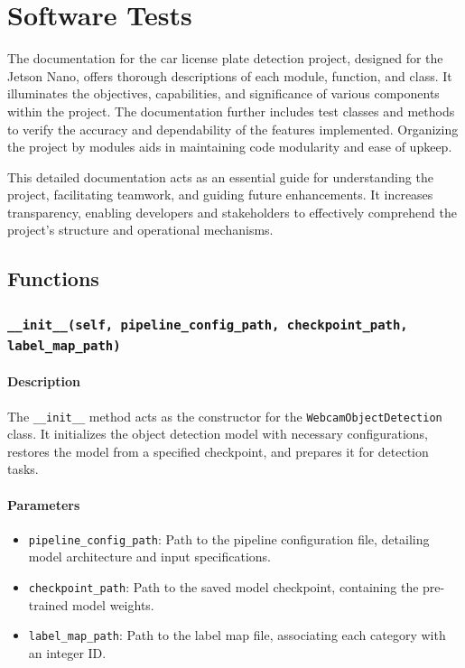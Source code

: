 %
%


\chapter{Software Tests }
\label{chapter:SoftwareTests}

	The documentation for the car license plate detection project, designed for the Jetson Nano, offers thorough descriptions of each module, function, and class. It illuminates the objectives, capabilities, and significance of various components within the project. The documentation further includes test classes and methods to verify the accuracy and dependability of the features implemented. Organizing the project by modules aids in maintaining code modularity and ease of upkeep.
	
	This detailed documentation acts as an essential guide for understanding the project, facilitating teamwork, and guiding future enhancements. It increases transparency, enabling developers and stakeholders to effectively comprehend the project's structure and operational mechanisms.


\section{Functions}

\subsection{\texttt{\_\_init\_\_(self, pipeline\_config\_path, checkpoint\_path, label\_map\_path)}}

\subsubsection{Description}
The \texttt{\_\_init\_\_} method acts as the constructor for the \texttt{WebcamObjectDetection} class. It initializes the object detection model with necessary configurations, restores the model from a specified checkpoint, and prepares it for detection tasks.

\subsubsection{Parameters}
\begin{itemize}
	\item \texttt{pipeline\_config\_path}: Path to the pipeline configuration file, detailing model architecture and input specifications.
	\item \texttt{checkpoint\_path}: Path to the saved model checkpoint, containing the pre-trained model weights.
	\item \texttt{label\_map\_path}: Path to the label map file, associating each category with an integer ID.
\end{itemize}

